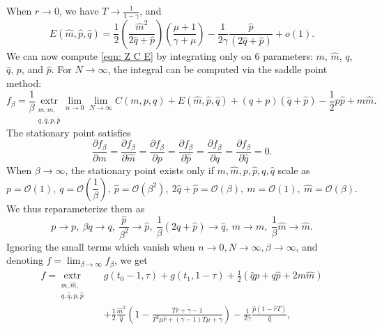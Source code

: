 \documentclass[9pt,twocolumn]{pnas-new}
\begin{document}
When $r\to 0$, we have $T\to \frac{1}{1-\gamma}$, and 
\begin{equation}\label{eqn: App E}
    E(\widehat{m},\widehat{p},\widehat{q})= \frac{1}{2}\left(\frac{ \widehat{m}^{2} }{2\widehat{q}+\widehat{p}}\right)\left(\frac{\mu+1}{\gamma+\mu}\right)-\frac{1}{2\gamma}\frac{\widehat{p}}{\left(2\widehat{q}+\widehat{p}\right)}+o(1).
\end{equation}
We can now compute \eqref{eqn: Z C E} by integrating only on $6$ parameters: $m$, $\widehat{m}$, $q$, $\widehat{q}$, $p$, and $\widehat{p}$. For $N\to\infty$, the integral can be computed via the saddle point method:
\begin{equation}\label{eqn: f beta}
    f_\beta=\frac{1}{\beta}\underset{\substack{m,\widehat{m},\\q,\widehat{q},p,\widehat{p}}}{\mathrm{extr}} \lim_{ n \to0}\lim_{N\to\infty}  C(m,p,q)+E(\widehat{m},\widehat{p},\widehat{q}) + \left(q+p\right)\left(\widehat{q}+\widehat{p}\right)-\frac{1}{2}p\widehat{p}+m\widehat{m}.
\end{equation}
The stationary point satisfies
\begin{equation}\label{eqn: APP sd1}
\frac{\partial f_{\beta}}{\partial m}=\frac{\partial f_{\beta}}{\partial\widehat{m}}=\frac{\partial f_{\beta}}{\partial p}=\frac{\partial f_{\beta}}{\partial\widehat{p}}=\frac{\partial f_{\beta}}{\partial q}=\frac{\partial f_{\beta}}{\partial\widehat{q}}=0.
\end{equation}
When $\beta \to \infty$, the stationary point exists only if $m,\widehat{m},p,\widehat{p},q,\widehat{q}$ scale as
\[
p=\mathcal{O}\left(1\right),~q=\mathcal{O}\left(\frac{1}{\beta}\right),~\widehat{p}=\mathcal{O}\left(\beta^{2}\right),~2\widehat{q}+\widehat{p}=\mathcal{O}\left(\beta\right),~m=\mathcal{O}\left(1\right),~\widehat{m}=\mathcal{O}\left(\beta\right).
\]
We thus reparameterize them as
\[
p\to p,~\beta q\to q,~\frac{\widehat{p}}{\beta^{2}}\to\widehat{p},~\frac{1}{\beta}\left(2\widehat{q}+\widehat{p}\right)\to\widehat{q},~m\to m,~\frac{1}{\beta}\widehat{m}\to\widehat{m}.
\]
Ignoring the small terms which vanish when $n \to 0, N \to \infty, \beta \to \infty$, and denoting $f=\lim _{\beta\to \infty} f_\beta$, we get
\begin{equation}
    \begin{aligned}\label{eqn: results f}
        f =\underset{\substack{m,\widehat{m},\\q,\widehat{q},p,\widehat{p}}}{\mathrm{extr}}  \quad  & g(t_0-1,\tau)+g(t_1,1-\tau) +\frac{1}{2}\left(\widehat{q}p+q\widehat{p}+2m\widehat{m}\right)\\
        &+\frac{1}{2}\frac{\widehat{m}^{2}}{\widehat{q}}\left(1-\frac{T \widehat{r}+\gamma-1}{T^{2} \mu \widehat{r}+(\gamma-1) T \mu+\gamma}\right)-\frac{1}{2\gamma}\frac{\widehat{p}\left(1- \widehat{r} T \right)}{\widehat{q}},
    \end{aligned}
\end{equation}
\end{document}
